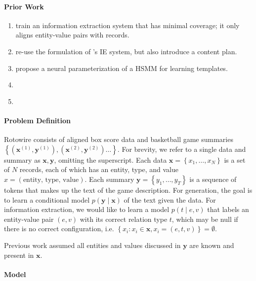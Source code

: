 \documentclass[11pt]{article}
\newcommand\set[1]{\left\{#1\right\}}
\newcommand{\bx}{\mathbf{x}}
\newcommand{\by}{\mathbf{y}}
\begin{document}
\paragraph{Prior Work}
\begin{enumerate}
\item \citet{wiseman2017d2t} train an information extraction system
that has minimal coverage; it only aligns entity-value pairs with records.
\item \citet{puduppully2018contentselection} re-use the formulation of \citet{wiseman2017d2t}'s IE 
system, but also introduce a content plan.
\item \citet{wiseman2018template} propose a neural parameterization of a HSMM for learning templates.
\item \citet{liang2009semalign}
\item \citet{sauper2009wiki}
\end{enumerate}

\paragraph{Problem Definition}
Rotowire consists of aligned box score data and basketball game summaries
$\set{(\bx^{(1)}, \by^{(1)}),(\bx^{(2)},\by^{(2)})\ldots}$.
For brevity, we refer to a single data and summary as $\bx,\by$, omitting the superscript.
Each data $\bx = \set{x_1,\ldots,x_N}$ is a set of $N$ records, each of which has
an entity, type, and value $x = (\text{entity, type, value})$.
Each summary $\by = \set{y_1,\ldots,y_T}$ is a sequence of tokens that makes up the
text of the game description.
For generation, the goal is to learn a conditional model $p(\by\mid\bx)$ of the text given the data.
For information extraction, we would like to learn a model $p(t\mid e,v)$ that labels an entity-value pair $(e,v)$
with its correct relation type $t$, which may be null if there is no correct configuration, i.e.
$\set{x_i:x_i\in\bx, x_i = (e,t,v)}=\emptyset$.

Previous work assumed all entities and values discussed in $\by$ are known and present in $\bx$.

\paragraph{Model}
\end{document}

